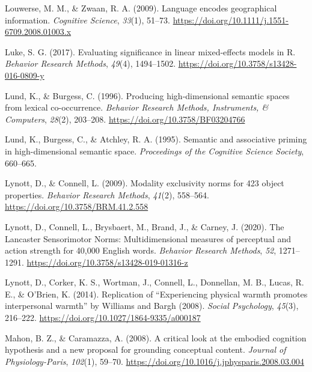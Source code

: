 \documentclass[
  12pt,
  man,floatsintext]{apa7}
\newlength{\cslhangindent}
\newlength{\cslentryspacingunit} %
\newenvironment{CSLReferences}[2] %
 {%
  \setlength{\parindent}{0pt}
  \ifodd #1
  \let\oldpar\par
  \def\par{\hangindent=\cslhangindent\oldpar}
  \fi
  \setlength{\parskip}{#2\cslentryspacingunit}
 }%
 {}
\begin{document}
\begin{CSLReferences}{1}{0}
\leavevmode{}%
Louwerse, M. M., \& Zwaan, R. A. (2009). Language encodes geographical information. \emph{Cognitive Science}, \emph{33}(1), 51--73. \url{https://doi.org/10.1111/j.1551-6709.2008.01003.x}

\leavevmode{}%
Luke, S. G. (2017). Evaluating significance in linear mixed-effects models in {R}. \emph{Behavior Research Methods}, \emph{49}(4), 1494--1502. \url{https://doi.org/10.3758/s13428-016-0809-y}

\leavevmode{}%
Lund, K., \& Burgess, C. (1996). Producing high-dimensional semantic spaces from lexical co-occurrence. \emph{Behavior Research Methods, Instruments, \& Computers}, \emph{28}(2), 203--208. \url{https://doi.org/10.3758/BF03204766}

\leavevmode{}%
Lund, K., Burgess, C., \& Atchley, R. A. (1995). Semantic and associative priming in high-dimensional semantic space. \emph{Proceedings of the Cognitive Science Society}, 660--665.

\leavevmode{}%
Lynott, D., \& Connell, L. (2009). Modality exclusivity norms for 423 object properties. \emph{Behavior Research Methods}, \emph{41}(2), 558--564. \url{https://doi.org/10.3758/BRM.41.2.558}

\leavevmode{}%
Lynott, D., Connell, L., Brysbaert, M., Brand, J., \& Carney, J. (2020). The {Lancaster Sensorimotor Norms}: {Multidimensional} measures of perceptual and action strength for 40,000 {English} words. \emph{Behavior Research Methods}, \emph{52}, 1271--1291. \url{https://doi.org/10.3758/s13428-019-01316-z}

\leavevmode{}%
Lynott, D., Corker, K. S., Wortman, J., Connell, L., Donnellan, M. B., Lucas, R. E., \& O'Brien, K. (2014). Replication of {``{Experiencing} physical warmth promotes interpersonal warmth''} by {Williams} and {Bargh} (2008). \emph{Social Psychology}, \emph{45}(3), 216--222. \url{https://doi.org/10.1027/1864-9335/a000187}

\leavevmode{}%
Mahon, B. Z., \& Caramazza, A. (2008). A critical look at the embodied cognition hypothesis and a new proposal for grounding conceptual content. \emph{Journal of Physiology-Paris}, \emph{102}(1), 59--70. \url{https://doi.org/10.1016/j.jphysparis.2008.03.004}


\end{CSLReferences}
\end{document}
